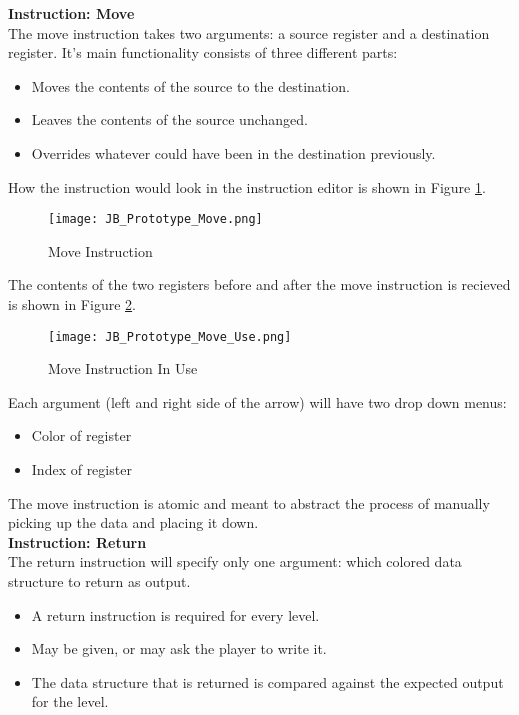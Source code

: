 \textbf{Instruction: Move}\\

The move instruction takes two arguments: a source register and a destination register.
It's main functionality consists of three different parts:

\begin{itemize}
  \item Moves the contents of the source to the destination.
  \item Leaves the contents of the source unchanged.
  \item Overrides whatever could have been in the destination previously.
\end{itemize}

How the instruction would look in the instruction editor is shown in Figure
\ref{fig:Move_Instruction}.

\begin{figure}[!hb]
  \caption{Move Instruction}
  \label{fig:Move_Instruction}
  \centering
  \texttt{[image: JB\_Prototype\_Move.png]}
\end{figure}

The contents of the two registers before and after the move instruction is
recieved is shown in Figure \ref{fig:Move_Instruction_Use}.

\begin{figure}[!hb]
  \caption{Move Instruction In Use}
  \label{fig:Move_Instruction_Use}
  \centering
  \texttt{[image: JB\_Prototype\_Move\_Use.png]}
\end{figure}

Each argument (left and right side of the arrow) will have two drop down menus:
\begin{itemize}
  \item Color of register
  \item Index of register
\end{itemize}

The move instruction is atomic and meant to abstract the process of manually
picking up the data and placing it down.\\

\textbf{Instruction: Return}\\

The return instruction will specify only one argument: which colored data structure
to return as output.
\begin{itemize}
  \item A return instruction is required for every level.
  \item May be given, or may ask the player to write it.
  \item The data structure that is returned is compared against the expected
  output for the level.
\end{itemize}

